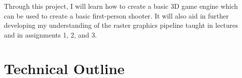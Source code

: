 \documentclass {article}
\begin{document}
Through this project, I will learn how to create a basic 3D game engine which can be used to create a basic first-person shooter. It will also aid in further developing my understanding of the raster graphics pipeline taught in lectures and in assignments 1, 2, and 3.











\newpage

\section{Technical Outline}
\newpage
\end{document}
